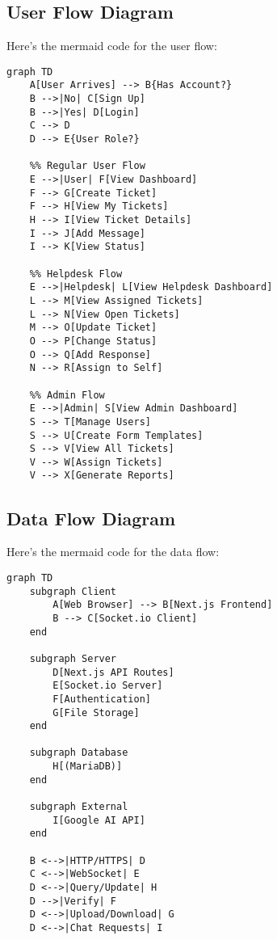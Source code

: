 \documentclass[12pt,a4paper]{article}
\begin{document}
\subsection{User Flow Diagram}


Here's the mermaid code for the user flow:

\begin{verbatim}
graph TD
    A[User Arrives] --> B{Has Account?}
    B -->|No| C[Sign Up]
    B -->|Yes| D[Login]
    C --> D
    D --> E{User Role?}

    %% Regular User Flow
    E -->|User| F[View Dashboard]
    F --> G[Create Ticket]
    F --> H[View My Tickets]
    H --> I[View Ticket Details]
    I --> J[Add Message]
    I --> K[View Status]

    %% Helpdesk Flow
    E -->|Helpdesk| L[View Helpdesk Dashboard]
    L --> M[View Assigned Tickets]
    L --> N[View Open Tickets]
    M --> O[Update Ticket]
    O --> P[Change Status]
    O --> Q[Add Response]
    N --> R[Assign to Self]

    %% Admin Flow
    E -->|Admin| S[View Admin Dashboard]
    S --> T[Manage Users]
    S --> U[Create Form Templates]
    S --> V[View All Tickets]
    V --> W[Assign Tickets]
    V --> X[Generate Reports]
\end{verbatim}

\subsection{Data Flow Diagram}


Here's the mermaid code for the data flow:

\begin{verbatim}
graph TD
    subgraph Client
        A[Web Browser] --> B[Next.js Frontend]
        B --> C[Socket.io Client]
    end

    subgraph Server
        D[Next.js API Routes]
        E[Socket.io Server]
        F[Authentication]
        G[File Storage]
    end

    subgraph Database
        H[(MariaDB)]
    end

    subgraph External
        I[Google AI API]
    end

    B <-->|HTTP/HTTPS| D
    C <-->|WebSocket| E
    D <-->|Query/Update| H
    D -->|Verify| F
    D <-->|Upload/Download| G
    D <-->|Chat Requests| I
\end{verbatim}
\end{document}

